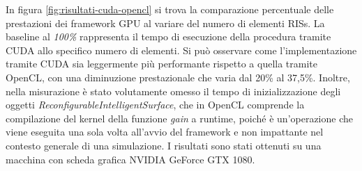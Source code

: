In figura \ref{fig:risultati-cuda-opencl} si trova la comparazione percentuale delle
prestazioni dei framework GPU al variare del numero di elementi RISs. La
baseline al \textit{100\%} rappresenta il tempo di esecuzione della procedura tramite
CUDA allo specifico numero di elementi. Si può osservare come l'implementazione
tramite CUDA sia leggermente più performante rispetto a quella tramite OpenCL, con
una diminuzione prestazionale che varia dal 20\% al 37,5\%. Inoltre, nella
misurazione è stato volutamente omesso il tempo di inizializzazione degli
oggetti \textit{ReconfigurableIntelligentSurface}, che in OpenCL comprende la
compilazione del kernel della funzione \textit{gain} a runtime, poiché è un'operazione
che viene eseguita una sola volta all'avvio del framework e non impattante nel
contesto generale di una simulazione. I risultati sono stati ottenuti su una macchina
con scheda grafica NVIDIA GeForce GTX 1080.

